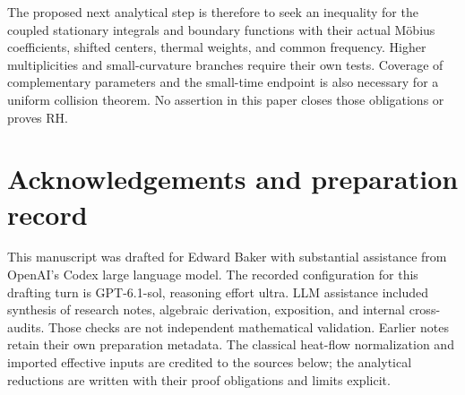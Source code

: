 \documentclass[11pt]{article}
\numberwithin{equation}{section}
\theoremstyle{definition}
\theoremstyle{remark}
\begin{document}
The proposed next analytical step is therefore to seek an inequality for
the coupled stationary integrals and boundary functions with their actual
M\"obius coefficients, shifted centers, thermal weights, and common
frequency. Higher multiplicities and small-curvature branches require
their own tests. Coverage of complementary parameters and the
small-time endpoint is also necessary for a uniform collision theorem.
No assertion in this paper closes those obligations or proves RH.

\section*{Acknowledgements and preparation record}
This manuscript was drafted for Edward Baker with substantial assistance
from OpenAI's Codex large language model. The recorded configuration for
this drafting turn is GPT-6.1-sol, reasoning effort ultra. LLM assistance
included synthesis of research notes, algebraic derivation, exposition,
and internal cross-audits. Those checks are not independent mathematical
validation. Earlier notes retain their own preparation metadata.
The classical heat-flow normalization and imported effective inputs are
credited to the sources below; the analytical reductions are written with
their proof obligations and limits explicit.
\end{document}
